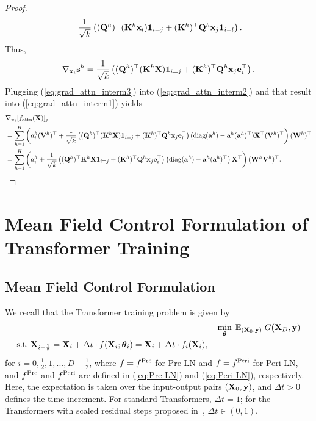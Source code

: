 \documentclass[journal]{IEEEtran}
\def\eqref#1{equation~\ref{#1}}
\newcommand{\bfK}{{\bf K}}
\newcommand{\bfQ}{{\bf Q}}
\newcommand{\bfV}{{\bf V}}
\newcommand{\bfW}{{\bf W}}
\newcommand{\bfX}{{\bf X}}
\newcommand{\bfa}{{\bf a}}
\newcommand{\bfe}{{\bf e}}
\newcommand{\bfs}{{\bf s}}
\newcommand{\bfx}{{\bf x}}
\newcommand{\bfy}{ {\bf y}}
\newcommand{\bftheta}{{\boldsymbol \theta}}
\renewcommand{\eqref}[1]{(\ref{#1})}
\theoremstyle{plain}
\theoremstyle{definition}
\theoremstyle{remark}
\begin{document}
\begin{proof}
\begin{align}
    &= \frac{1}{\sqrt{k}}  \left(  (\bfQ^h)^\top (\bfK^h \bfx_l)\mathbf{1}_{i=j} + (\bfK^h)^\top \bfQ^h \bfx_j \mathbf{1}_{i=l} \right).
\end{align}
Thus,
\begin{equation}
    \nabla_{\bfx_i} \bfs^h = \frac{1}{\sqrt{k}}  \left(  (\bfQ^h)^\top (\bfK^h \bfX) \mathbf{1}_{i=j}+ (\bfK^h)^\top \bfQ^h \bfx_j \bfe_i^\top \right). \label{eq:grad_attn_interm3}
\end{equation}
Plugging (\ref{eq:grad_attn_interm3}) into (\ref{eq:grad_attn_interm2}) and that result into (\ref{eq:grad_attn_interm1}) yields
\begin{align}
& \nabla_{\bfx_i} [f_{\rm attn}(\bfX)]_j \\ &=
\sum_{h=1}^H  \left(  a^h_i (\bfV^h)^\top + \frac{1}{\sqrt{k}}  \left(  (\bfQ^h)^\top (\bfK^h \bfX) \mathbf{1}_{i=j}+ (\bfK^h)^\top \bfQ^h \bfx_j \bfe_i^\top \right) ({\rm diag}(\bfa^h) - \bfa^h (\bfa^h)^\top) \bfX^\top (\bfV^h )^\top \right) (\bfW^h)^\top \\
&=  \sum_{h=1}^H \left( a^h_i + \frac{1}{\sqrt{k}} \left((\bfQ^h)^\top \bfK^h \bfX \mathbf{1}_{i=j} + (\bfK^h)^\top \bfQ^h \bfx_j \bfe_i^\top \right) \left({\rm diag}(\bfa^h)-\bfa^h (\bfa^h)^\top \right) \bfX^\top \right) (\bfW^h \bfV^h)^\top.
\end{align}
\end{proof}

\section{Mean Field Control Formulation of Transformer Training}\label{sec:MFC}

\subsection{Mean Field Control Formulation} We recall that the Transformer training problem is given by
\begin{align}\label{eq:discrete_time_OC_obj_appendix}
    & \min_{\bftheta} \; \mathbb{E}_{(\bfX_0, \bfy)} \; G(\bfX_D, \bfy) \\ 
    \begin{split} &\text{s.t.} \; \bfX_{i+\frac{1}{2}} = 
    \bfX_i + \Delta t \cdot f(\bfX_{i}; \bftheta_i) = \bfX_i + \Delta t\cdot f_i(\bfX_{i}),
\end{split}
\end{align}
for $i=0,\frac{1}{2},1,...,D-\frac{1}{2}$, where $f = f^{\rm Pre}$ for Pre-LN and $f= f^{\rm Peri} $ for Peri-LN, and $f^{\rm Pre}$ and $f^{\rm Peri}$ are defined in \eqref{eq:Pre-LN} and \eqref{eq:Peri-LN}, respectively.
Here, the expectation is taken over the input-output pairs $(\bfX_0, \bfy)$, and $\Delta t >0$ defines the time increment. For standard Transformers, $\Delta t=1$; for the Transformers with scaled residual steps proposed in~, $\Delta t \in (0, 1)$.
\end{document}
